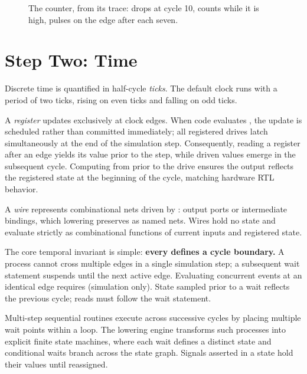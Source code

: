 \documentclass[journal,9pt]{IEEEtran}
\begin{document}
\begin{figure}[htbp]
\centering

\caption{The counter, from its trace:  drops at cycle
10,  counts while it is high,  pulses on the
edge after each seven.}
\label{fig:t-counter}
\end{figure}



\section{Step Two: Time}
\label{sec:t-time}

Discrete time is quantified in half-cycle \emph{ticks}. The default clock runs
with a period of two ticks, rising on even ticks and falling on odd ticks.

A \emph{register} updates exclusively at clock edges. When code evaluates
, the update is scheduled rather than committed
immediately; all registered drives latch simultaneously at the end of the
simulation step. Consequently, reading a register after an edge yields its value
prior to the step, while driven values emerge in the subsequent cycle. Computing
 from  prior to the drive ensures the output reflects the
registered state at the beginning of the cycle, matching hardware RTL behavior.

A \emph{wire} represents combinational nets driven by : output ports
or intermediate  bindings, which lowering preserves as named nets.
Wires hold no state and evaluate strictly as combinational functions of current
inputs and registered state.

The core temporal invariant is simple: \textbf{every  defines a
cycle boundary.} A process cannot cross multiple edges in a single simulation
step; a subsequent wait statement suspends until the next active edge.
Evaluating concurrent events at an identical edge requires 
(simulation only). State sampled prior to a wait reflects the previous cycle;
reads must follow the wait statement.

Multi-step sequential routines execute across successive cycles by placing
multiple wait points within a loop. The lowering engine transforms such
processes into explicit finite state machines, where each wait defines a
distinct state and conditional waits branch across the state graph. Signals
asserted in a state hold their values until reassigned.
\end{document}
